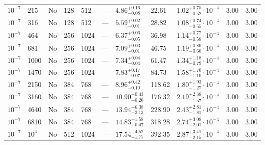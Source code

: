 \documentclass[aps, prfluids, onecolumn, notitlepage, nofootinbib, groupedaddress, amsfonts, amssymb, amsmath]{revtex4-1}
\begin{document}
\begin{center}
\begin{longtable}{ p{1cm} p{1cm} p{1cm} p{1cm} p{1cm} p{1cm} p{1.75cm} p{1.5cm} p{2.75cm} p{1cm} p{1.2cm}  }
\vspace{0.08cm}$10^{-7}$	&	215	&	No	&	128	&	512	&	---	&$	4.86	_{-	0.08	}^{+	0.16	}$&	22.61	&$	1.02	_{-	0.52	}^{+	0.75}\cdot 10^{-4}	$&	3.00	&	3.00	\\
\vspace{0.08cm}$10^{-7}$	&	316	&	No	&	128	&	512	&	---	&$	5.59	_{-	0.01	}^{+	0.02	}$&	28.82	&$	1.08	_{-	0.55	}^{+	0.74}\cdot 10^{-4}	$&	3.00	&	3.00	\\
\vspace{0.08cm}$10^{-7}$	&	464	&	No	&	256	&	1024	&	---	&$	6.37	_{-	0.05	}^{+	0.06	}$&	36.98	&$	1.14	_{-	0.58	}^{+	0.77}\cdot 10^{-4}	$&	3.00	&	3.00	\\
\vspace{0.08cm}$10^{-7}$	&	681	&	No	&	256	&	1024	&	---	&$	7.09	_{-	0.01	}^{+	0.03	}$&	46.75	&$	1.19	_{-	0.60	}^{+	0.80}\cdot 10^{-4}	$&	3.00	&	3.00	\\
\vspace{0.08cm}$10^{-7}$	&	1000	&	No	&	256	&	1024	&	---	&$	7.34	_{-	0.04	}^{+	0.04	}$&	61.47	&$	1.34	_{-	0.79	}^{+	1.18}\cdot 10^{-4}	$&	3.00	&	3.00	\\
\vspace{0.08cm}$10^{-7}$	&	1470	&	No	&	256	&	1024	&	---	&$	7.83	_{-	0.07	}^{+	0.17	}$&	84.73	&$	1.58	_{-	1.10	}^{+	1.70}\cdot 10^{-4}	$&	3.00	&	3.00	\\
\vspace{0.08cm}$10^{-7}$	&	2150	&	No	&	384	&	768	&	---	&$	8.96	_{-	0.10	}^{+	0.42	}$&	118.62	&$	1.80	_{-	1.27	}^{+	1.93}\cdot 10^{-4}	$&	3.00	&	3.00	\\
\vspace{0.08cm}$10^{-7}$	&	3160	&	No	&	384	&	768	&	---	&$	10.90	_{-	0.20	}^{+	0.43	}$&	176.32	&$	2.19	_{-	1.57	}^{+	2.38}\cdot 10^{-4}	$&	3.00	&	3.00	\\
\vspace{0.08cm}$10^{-7}$	&	4640	&	No	&	384	&	768	&	---	&$	13.94	_{-	2.13	}^{+	6.38	}$&	228.90	&$	2.43	_{-	1.81	}^{+	2.81}\cdot 10^{-4}	$&	3.00	&	3.00	\\
\vspace{0.08cm}$10^{-7}$	&	6810	&	No	&	384	&	768	&	---	&$	14.83	_{-	0.47	}^{+	1.58	}$&	318.28	&$	2.74	_{-	2.01	}^{+	3.08}\cdot 10^{-4}	$&	3.00	&	3.00	\\
\vspace{0.08cm}$10^{-7}$	&	$10^4$	&	No	&	512	&	1024	&	---	&$	17.54	_{-	1.77	}^{+	4.52	}$&	392.35	&$	2.87	_{-	2.15	}^{+	3.41}\cdot 10^{-4}	$&	3.00	&	3.00	\\

\hline
\end{longtable}
\end{center}
\end{document}
